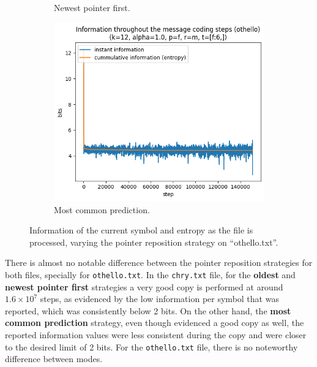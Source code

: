 \documentclass{article}
\begin{document}
\begin{figure}
\begin{subfigure}[b]{0.3\textwidth}
\begin{center}
        \end{center}
        \caption{Newest pointer first.}
        \label{fig:results-reposition-other-o}
    \end{subfigure}
    \hfill
    \begin{subfigure}[b]{0.3\textwidth}
        \begin{center}
            \includegraphics[width=1.0\linewidth]{../scripts/images/othello_12_1.0_f_m_[f:6,].png}
        \end{center}
        \caption{Most common prediction.}
        \label{fig:results-reposition-other-m}
    \end{subfigure}
    \caption{Information of the current symbol and entropy as the file is processed, varying the pointer reposition strategy on ``othello.txt''.}
    \label{fig:results-reposition-other}
\end{figure}

There is almost no notable difference between the pointer reposition strategies for both files, specially for \verb|othello.txt|.
In the \verb|chry.txt| file, for the \textbf{oldest} and \textbf{newest pointer first} strategies a very good copy is performed at around $1.6\times10^7$ steps, as evidenced by the low information per symbol that was reported, which was consistently below 2 bits.
On the other hand, the \textbf{most common prediction} strategy, even though evidenced a good copy as well, the reported information values were less consistent during the copy and were closer to the desired limit of 2 bits.
For the \verb|othello.txt| file, there is no noteworthy difference between modes.
\end{document}
